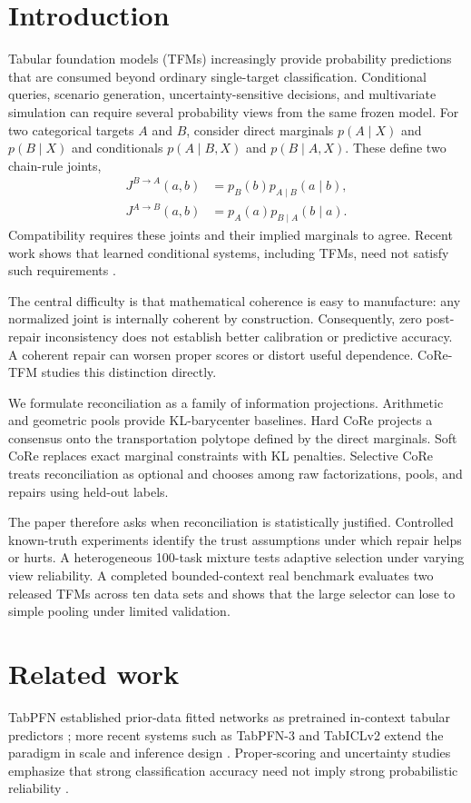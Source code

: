 \documentclass[pdflatex,sn-basic]{sn-jnl}
\newcommand{\Jone}{J^{B\rightarrow A}}
\newcommand{\Jtwo}{J^{A\rightarrow B}}
\theoremstyle{plain}
\begin{document}
\section{Introduction}\label{sec:intro}
Tabular foundation models (TFMs) increasingly provide probability predictions that are consumed beyond ordinary single-target classification. Conditional queries, scenario generation, uncertainty-sensitive decisions, and multivariate simulation can require several probability views from the same frozen model. For two categorical targets $A$ and $B$, consider direct marginals $p(A\mid X)$ and $p(B\mid X)$ and conditionals $p(A\mid B,X)$ and $p(B\mid A,X)$. These define two chain-rule joints,
\begin{align}
\Jone(a,b)&=p_B(b)p_{A\mid B}(a\mid b),\\
\Jtwo(a,b)&=p_A(a)p_{B\mid A}(b\mid a).
\end{align}
Compatibility requires these joints and their implied marginals to agree. Recent work shows that learned conditional systems, including TFMs, need not satisfy such requirements \citep{klotergens2026agree,majid2025consistent}.

The central difficulty is that mathematical coherence is easy to manufacture: any normalized joint is internally coherent by construction. Consequently, zero post-repair inconsistency does not establish better calibration or predictive accuracy. A coherent repair can worsen proper scores or distort useful dependence. CoRe-TFM studies this distinction directly.

We formulate reconciliation as a family of information projections. Arithmetic and geometric pools provide KL-barycenter baselines. Hard CoRe projects a consensus onto the transportation polytope defined by the direct marginals. Soft CoRe replaces exact marginal constraints with KL penalties. Selective CoRe treats reconciliation as optional and chooses among raw factorizations, pools, and repairs using held-out labels.

The paper therefore asks when reconciliation is statistically justified. Controlled known-truth experiments identify the trust assumptions under which repair helps or hurts. A heterogeneous 100-task mixture tests adaptive selection under varying view reliability. A completed bounded-context real benchmark evaluates two released TFMs across ten data sets and shows that the large selector can lose to simple pooling under limited validation.

\section{Related work}\label{sec:related}
TabPFN established prior-data fitted networks as pretrained in-context tabular predictors \citep{hollmann2025tabpfn}; more recent systems such as TabPFN-3 and TabICLv2 extend the paradigm in scale and inference design \citep{grinsztajn2026tabpfn3,qu2026tabiclv2}. Proper-scoring and uncertainty studies emphasize that strong classification accuracy need not imply strong probabilistic reliability \citep{landsgesell2026scoringbench,johnson2026uq}.
\end{document}
